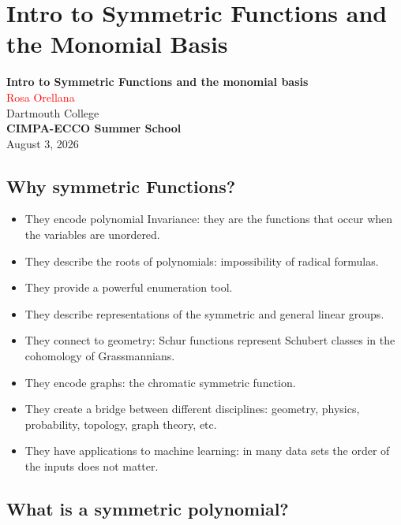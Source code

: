 \documentclass[12pt]{memoir}
\begin{document}
\chapter{Intro to Symmetric Functions and the Monomial Basis}

\begin{center}
    {\Huge \textbf{Intro to Symmetric Functions and the monomial basis}}\\[1.5em]
    {\Large \textcolor{red}{Rosa Orellana}}\\[0.5em]
    {\large \textcolor{verdeUCR}{Dartmouth College}}\\[0.5em]
    {\large \textbf{CIMPA-ECCO Summer School}}\\[0.5em]
    {\large August 3, 2026}
\end{center}

\newpage

\section{Why symmetric Functions?}

\begin{itemize}[label=$\diamond$]
    \item They encode polynomial Invariance: they are the functions that occur when the variables are unordered.
    \item They describe the roots of polynomials: impossibility of radical formulas.
    \item They provide a powerful enumeration tool.
    \item They describe representations of the symmetric and general linear groups.
    \item They connect to geometry: Schur functions represent Schubert classes in the cohomology of Grassmannians.
    \item They encode graphs: the chromatic symmetric function.
    \item They create a bridge between different disciplines: geometry, physics, probability, topology, graph theory, etc.
    \item They have applications to machine learning: in many data sets the order of the inputs does not matter.
\end{itemize}

\newpage

\section{What is a symmetric polynomial?}
\end{document}
